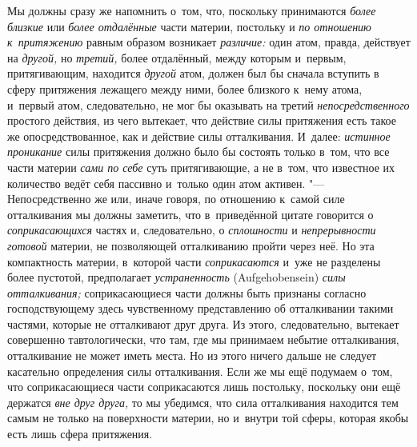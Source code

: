 Мы должны сразу же напомнить о~том, что, поскольку принимаются
{\em более близкие} или {\em более
отдалённые} части материи, постольку и {\em по
отношению к~притяжению} равным образом возникает
{\em различие:} один атом, правда, действует на {\em другой,} но {\em третий,}
более отдалённый, между которым и~первым, притягивающим, находится
{\em другой} атом, должен был бы сначала вступить в
сферу притяжения лежащего между ними, более близкого к~нему атома, и~первый
атом, следовательно, не мог бы оказывать на третий
{\em непосредственного} простого действия, из чего
вытекает, что действие силы притяжения есть такое же опосредствованное, как
и действие силы отталкивания. И~далее: {\em истинное
проникание} силы притяжения должно было бы состоять только в~том, что все
части материи {\em сами по себе} суть притягивающие, а
не в~том, что известное их количество ведёт себя пассивно и~только один
атом активен. "--- Непосредственно же или, иначе говоря, по отношению к~самой
силе отталкивания мы должны заметить, что в~приведённой цитате говорится о
{\em соприкасающихся} частях и, следовательно, о
{\em сплошности} и
{\em непрерывности готовой} материи, не позволяющей
отталкиванию пройти через неё. Но эта компактность материи, в~которой части
{\em соприкасаются} и~уже не разделены более пустотой,
предполагает {\em устраненность} (Auf\-ge\-ho\-ben\-sein)
{\em силы отталкивания;} соприкасающиеся части должны
быть признаны согласно господствующему здесь чувственному представлению об
отталкивании такими частями, которые не отталкивают друг друга. Из этого,
следовательно, вытекает совершенно тавтологически, что там, где мы
принимаем небытие отталкивания, отталкивание не может иметь места. Но из
этого ничего дальше не следует касательно определения силы отталкивания.
Если же мы ещё подумаем о~том, что соприкасающиеся части соприкасаются лишь
постольку, поскольку они ещё держатся {\em вне друг
друга,} то мы убедимся, что сила отталкивания находится тем самым не только
на поверхности материи, но и~внутри той сферы, которая якобы есть лишь
сфера притяжения.

